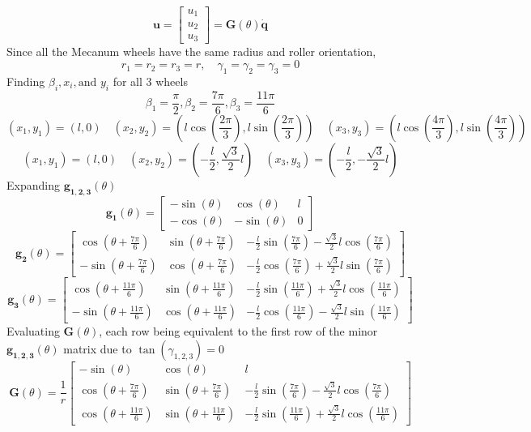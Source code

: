 \documentclass{article}
\begin{document}
\begin{equation}
    \bm{\mathbf{u}} = \begin{bmatrix}
    u_1 \\ u_2 \\ u_3
\end{bmatrix} = \bm{\mathbf{G}}(\theta)\bm{\mathbf{\dot{q}}}
\end{equation}
\[\]
Since all the Mecanum wheels have the same radius and roller orientation,
\[
r_1 = r_2 = r_3 = r, \quad \gamma_1 = \gamma_2 = \gamma_3 = 0
\]
Finding \(\beta_i, x_i, \text{and } y_i\) for all 3 wheels
\[
\beta_1 = \frac{\pi}{2}, \beta_2 = \frac{7\pi}{6}, \beta_3 = \frac{11\pi}{6}
\]
\[
(x_1, y_1) = (l, 0) \quad (x_2, y_2) = (l\cos(\frac{2\pi}{3}), l\sin(\frac{2\pi}{3})) \quad (x_3, y_3) = (l\cos(\frac{4\pi}{3}), l\sin(\frac{4\pi}{3}))
\]
\[
(x_1, y_1) = (l, 0) \quad (x_2, y_2) = (-\frac{l}{2}, \frac{\sqrt{3}}{2}l) \quad (x_3, y_3) = (-\frac{l}{2}, -\frac{\sqrt{3}}{2}l)
\]
Expanding \(\bm{\mathbf{g_{1,2,3}}}(\theta)\)
\[
\bm{\mathbf{g_1}}(\theta) = \begin{bmatrix}
    -\sin(\theta) & \cos(\theta) & l \\ -\cos(\theta) & -\sin(\theta) & 0
\end{bmatrix}
\]
\[
\renewcommand{\arraystretch}{1.3}
\bm{\mathbf{g_2}}(\theta) = \begin{bmatrix}
    \cos(\theta + \frac{7\pi}{6}) & \sin(\theta + \frac{7\pi}{6}) & -\frac{l}{2}\sin(\frac{7\pi}{6}) - \frac{\sqrt{3}}{2}l\cos(\frac{7\pi}{6}) \\ -\sin(\theta + \frac{7\pi}{6}) & \cos(\theta + \frac{7\pi}{6}) & -\frac{l}{2}\cos(\frac{7\pi}{6}) + \frac{\sqrt{3}}{2}l\sin(\frac{7\pi}{6})
\end{bmatrix}
\]
\[
\renewcommand{\arraystretch}{1.3}
\bm{\mathbf{g_3}}(\theta) = \begin{bmatrix}
    \cos(\theta + \frac{11\pi}{6}) & \sin(\theta + \frac{11\pi}{6}) & -\frac{l}{2}\sin(\frac{11\pi}{6}) + \frac{\sqrt{3}}{2}l\cos(\frac{11\pi}{6}) \\ -\sin(\theta + \frac{11\pi}{6}) & \cos(\theta + \frac{11\pi}{6}) & -\frac{l}{2}\cos(\frac{11\pi}{6}) - \frac{\sqrt{3}}{2}l\sin(\frac{11\pi}{6})
\end{bmatrix}
\]
Evaluating \(\bm{\mathbf{G}}(\theta)\), each row being equivalent to the first row of the minor \(\bm{\mathbf{g_{1,2,3}}}(\theta)\) matrix due to \(\tan(\gamma_{1,2,3}) = 0\)
\[
\renewcommand{\arraystretch}{1.3}
\bm{\mathbf{G}}(\theta) = \frac{1}{r}\begin{bmatrix}
     -\sin(\theta) & \cos(\theta) & l \\  \cos(\theta + \frac{7\pi}{6}) & \sin(\theta + \frac{7\pi}{6}) & -\frac{l}{2}\sin(\frac{7\pi}{6}) - \frac{\sqrt{3}}{2}l\cos(\frac{7\pi}{6}) \\  \cos(\theta + \frac{11\pi}{6}) & \sin(\theta + \frac{11\pi}{6}) & -\frac{l}{2}\sin(\frac{11\pi}{6}) + \frac{\sqrt{3}}{2}l\cos(\frac{11\pi}{6})
\end{bmatrix}
\]
\end{document}
